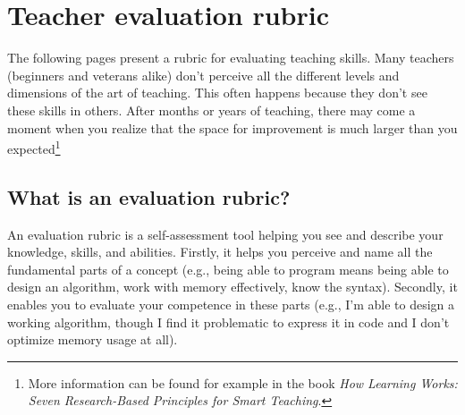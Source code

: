 
\newcommand{\rubriccriterion}[4]{
\stepcounter{rubricquestion}
\section*{\therubricquestion: #1}

\smallskip
\note{Unaware:} #2

\note{Beginner:} #3

\note{Guru:} #4

\medskip
\begin{tikzpicture}
\draw (0,0) -- (8,0);
\foreach \i in {0,1,...,8} %
{
\fill[black] (\i,0) circle (1.5 mm);
\fill[white] (\i,0) circle (1.4 mm);
}
\node at (0.15, -0.5) {unaware};
\node at (3, -0.5)    {beginner};
\node at (8, -0.5)    {guru};
\end{tikzpicture}
}

\restoregeometry
\chapter*{Teacher evaluation rubric}
\label{rubric}

The following pages present a rubric for evaluating teaching skills. Many teachers (beginners and veterans alike) don't perceive all the different levels and dimensions of the art of teaching. This often happens because they don't see these skills in others. After months or years of teaching, there may come a moment when you realize that the space for improvement is much larger than you expected\footnote{More information can be found for example in the book \emph{How Learning Works: Seven Research-Based Principles for Smart Teaching}.}

\section*{What is an evaluation rubric?}

An evaluation rubric is a self-assessment tool helping you see and describe your knowledge, skills, and abilities. Firstly, it helps you perceive and name all the fundamental parts of a concept (e.g., being able to program means being able to design an algorithm, work with memory effectively, know the syntax). Secondly, it enables you to evaluate your competence in these parts (e.g., I'm able to design a working algorithm, though I find it problematic to express it in code and I don't optimize memory usage at all).

